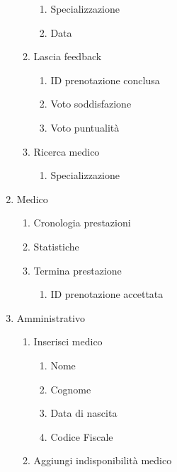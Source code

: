 \documentclass[12pt]{report}
\begin{document}
\begin{enumerate}
\begin{enumerate}
\begin{enumerate}
                        \item Specializzazione
                        \item Data
                    \end{enumerate}
                \item Lascia feedback
                    \begin{enumerate}
                        \item ID prenotazione conclusa
                        \item Voto soddisfazione
                        \item Voto puntualità
                    \end{enumerate}
                \item Ricerca medico
                    \begin{enumerate}
                        \item Specializzazione
                    \end{enumerate}
        \end{enumerate}
        \item Medico
            \begin{enumerate}
                \item Cronologia prestazioni
                \item Statistiche
                \item Termina prestazione
                    \begin{enumerate}
                        \item ID prenotazione accettata
                    \end{enumerate}
            \end{enumerate}
        \item Amministrativo
            \begin{enumerate}
                \item Inserisci medico
                    \begin{enumerate}
                        \item Nome
                        \item Cognome
                        \item Data di nascita
                        \item Codice Fiscale
                    \end{enumerate}
                \item Aggiungi indisponibilità medico

\end{enumerate}
\end{enumerate}
\end{document}
